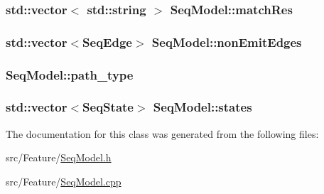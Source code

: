 \hypertarget{class_seq_model_a54fb4d0461e8aaec7c53568a6ff572fa}{
\subsubsection[{match\+Res}]{\setlength{\rightskip}{0pt plus 5cm}std\+::vector$<$ std\+::string $>$ Seq\+Model\+::match\+Res\hspace{0.3cm}{\ttfamily [private]}}}\label{class_seq_model_a54fb4d0461e8aaec7c53568a6ff572fa}
\hypertarget{class_seq_model_a3524cea66ad824e5ba165f09080dc8eb}{
\subsubsection[{non\+Emit\+Edges}]{\setlength{\rightskip}{0pt plus 5cm}std\+::vector$<${\bf Seq\+Edge}$>$ Seq\+Model\+::non\+Emit\+Edges\hspace{0.3cm}{\ttfamily [private]}}}\label{class_seq_model_a3524cea66ad824e5ba165f09080dc8eb}
\hypertarget{class_seq_model_afa1904812bb4a3363960db559983e195}{
\subsubsection[{path\+\_\+type}]{ Seq\+Model\+::path\+\_\+type\hspace{0.3cm}{\ttfamily [private]}}}\label{class_seq_model_afa1904812bb4a3363960db559983e195}
\hypertarget{class_seq_model_af937cc40b67b7c5063feab1950445b88}{
\subsubsection[{states}]{\setlength{\rightskip}{0pt plus 5cm}std\+::vector$<${\bf Seq\+State}$>$ Seq\+Model\+::states\hspace{0.3cm}{\ttfamily [private]}}}\label{class_seq_model_af937cc40b67b7c5063feab1950445b88}


The documentation for this class was generated from the following files\+:\begin{DoxyCompactItemize}
\item 
src/\+Feature/\hyperlink{_seq_model_8h}{Seq\+Model.\+h}\item 
src/\+Feature/\hyperlink{_seq_model_8cpp}{Seq\+Model.\+cpp}\end{DoxyCompactItemize}
